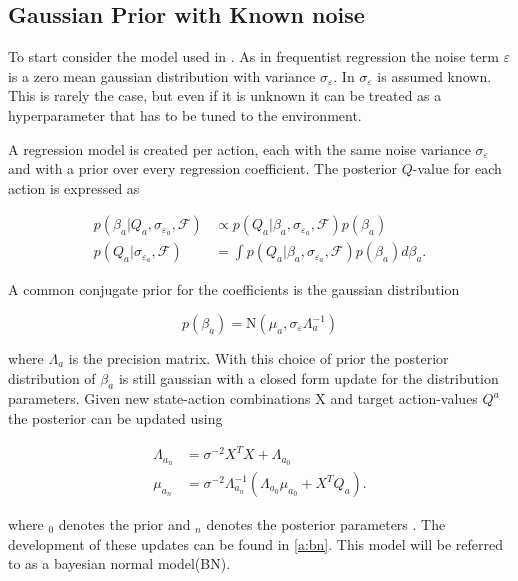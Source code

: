 \subsection{Gaussian Prior with Known noise}

To start consider the model used in \cite{azziz_2018}. As in frequentist regression the noise term $\varepsilon$ is a zero mean gaussian distribution with variance $\sigma_\varepsilon$. In \cite{azziz_2018} $\sigma_\varepsilon$ is assumed known. This is rarely the case, but even if it is unknown it can be treated as a hyperparameter that has to be tuned to the environment. 

A regression model is created per action, each with the same noise variance $\sigma_\varepsilon$ and with a prior over every regression coefficient. The posterior $Q$-value for each action is expressed as 

\begin{align*}
    p(\beta_a |Q_a, \sigma_{\varepsilon_a}, \mathcal{F}) &\propto p(Q_a| \beta_a, \sigma_{\varepsilon_a}, \mathcal{F})p(\beta_a) \\
    p(Q_a|\sigma_{\varepsilon_a}, \mathcal{F}) &= \int p(Q_a|\beta_a, \sigma_{\varepsilon_a}, \mathcal{F}) p(\beta_a)d\beta_a.
\end{align*}

A common conjugate prior for the coefficients is the gaussian distribution 

$$
p(\beta_a) = \text{N}(\mu_a, \sigma_\varepsilon\Lambda_a^{-1}) 
$$

where $\Lambda_a$ is the precision matrix. With this choice of prior the posterior distribution of $\beta_a$ is still gaussian with a closed form update for the distribution parameters. Given new state-action combinations X and target action-values $Q^a$ the posterior can be updated using 

\begin{equation}
    \begin{split}
        \label{eq:known_noise_posterior_update}
        \Lambda_{a_n} & = \sigma^{-2}X^TX + \Lambda_{a_0} \\
        \mu_{a_n}     & = \sigma^{-2}\Lambda_{a_n}^{-1}(\Lambda_{a_0}\mu_{a_0} + X^TQ_a).
    \end{split}
\end{equation}

where $_0$ denotes the prior and $_n$ denotes the posterior parameters \citep[p.~233]{fahrmeir_2013}. The development of these updates can be found in \ref{a:bn}. This model will be referred to as a bayesian normal model(BN).

